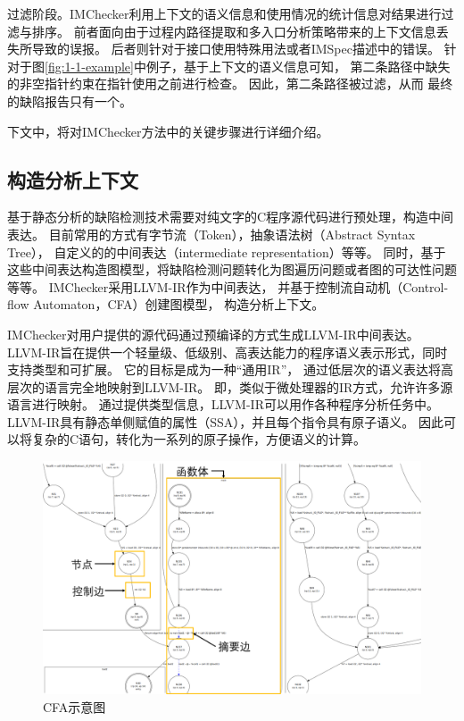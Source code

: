 过滤阶段。IMChecker利用上下文的语义信息和使用情况的统计信息对结果进行过滤与排序。
前者面向由于过程内路径提取和多入口分析策略带来的上下文信息丢失所导致的误报。
后者则针对于接口使用特殊用法或者IMSpec描述中的错误。
针对于图\ref{fig:1-1-example}中例子，基于上下文的语义信息可知，
第二条路径中缺失的非空指针约束在指针使用之前进行检查。
因此，第二条路径被过滤，从而
最终的缺陷报告只有一个。

下文中，将对IMChecker方法中的关键步骤进行详细介绍。

\subsection{构造分析上下文}
基于静态分析的缺陷检测技术需要对纯文字的C程序源代码进行预处理，构造中间表达。
目前常用的方式有字节流（Token），抽象语法树（Abstract Syntax Tree），
自定义的的中间表达（intermediate representation）等等。
同时，基于这些中间表达构造图模型，将缺陷检测问题转化为图遍历问题或者图的可达性问题等等。
IMChecker采用LLVM-IR作为中间表达，
并基于控制流自动机（Control-flow Automaton，CFA）创建图模型，
构造分析上下文。

IMChecker对用户提供的源代码通过预编译的方式生成LLVM-IR中间表达。
LLVM-IR旨在提供一个轻量级、低级别、高表达能力的程序语义表示形式，同时支持类型和可扩展。
它的目标是成为一种“通用IR”，
通过低层次的语义表达将高层次的语言完全地映射到LLVM-IR。
即，类似于微处理器的IR方式，允许许多源语言进行映射。
通过提供类型信息，LLVM-IR可以用作各种程序分析任务中。
LLVM-IR具有静态单侧赋值的属性（SSA），并且每个指令具有原子语义。
因此可以将复杂的C语句，转化为一系列的原子操作，方便语义的计算。

\begin{figure}[t]
	\centering
	\includegraphics[width=0.7\linewidth]{figures/cp3-3-cfa.png}
	\caption{
		CFA示意图
	}
	\label{fig:3-3-cfa}
\end{figure}

